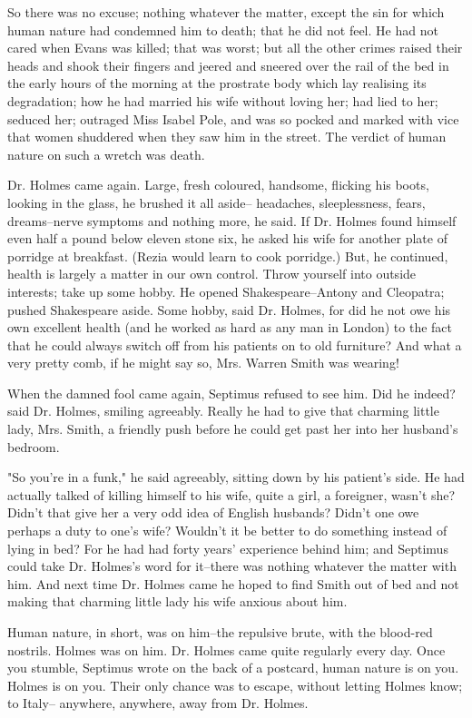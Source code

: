 \documentclass[lang=cn,10pt]{elegantbook}
\begin{document}
So there was no excuse; nothing whatever the matter, except the sin
for which human nature had condemned him to death; that he did not
feel.  He had not cared when Evans was killed; that was worst; but
all the other crimes raised their heads and shook their fingers and
jeered and sneered over the rail of the bed in the early hours of
the morning at the prostrate body which lay realising its
degradation; how he had married his wife without loving her; had
lied to her; seduced her; outraged Miss Isabel Pole, and was so
pocked and marked with vice that women shuddered when they saw him
in the street.  The verdict of human nature on such a wretch was
death.

Dr. Holmes came again.  Large, fresh coloured, handsome, flicking
his boots, looking in the glass, he brushed it all aside--
headaches, sleeplessness, fears, dreams--nerve symptoms and nothing
more, he said.  If Dr. Holmes found himself even half a pound below
eleven stone six, he asked his wife for another plate of porridge
at breakfast.  (Rezia would learn to cook porridge.)  But, he
continued, health is largely a matter in our own control.  Throw
yourself into outside interests; take up some hobby.  He opened
Shakespeare--Antony and Cleopatra; pushed Shakespeare aside.  Some
hobby, said Dr. Holmes, for did he not owe his own excellent health
(and he worked as hard as any man in London) to the fact that he
could always switch off from his patients on to old furniture?  And
what a very pretty comb, if he might say so, Mrs. Warren Smith was
wearing!

When the damned fool came again, Septimus refused to see him.  Did
he indeed? said Dr. Holmes, smiling agreeably.  Really he had to
give that charming little lady, Mrs. Smith, a friendly push before
he could get past her into her husband's bedroom.

"So you're in a funk," he said agreeably, sitting down by his
patient's side.  He had actually talked of killing himself to his
wife, quite a girl, a foreigner, wasn't she?  Didn't that give her
a very odd idea of English husbands?  Didn't one owe perhaps a duty
to one's wife?  Wouldn't it be better to do something instead of
lying in bed?  For he had had forty years' experience behind him;
and Septimus could take Dr. Holmes's word for it--there was nothing
whatever the matter with him.  And next time Dr. Holmes came he
hoped to find Smith out of bed and not making that charming little
lady his wife anxious about him.

Human nature, in short, was on him--the repulsive brute, with the
blood-red nostrils.  Holmes was on him.  Dr. Holmes came quite
regularly every day.  Once you stumble, Septimus wrote on the back
of a postcard, human nature is on you.  Holmes is on you.  Their
only chance was to escape, without letting Holmes know; to Italy--
anywhere, anywhere, away from Dr. Holmes.
\end{document}
